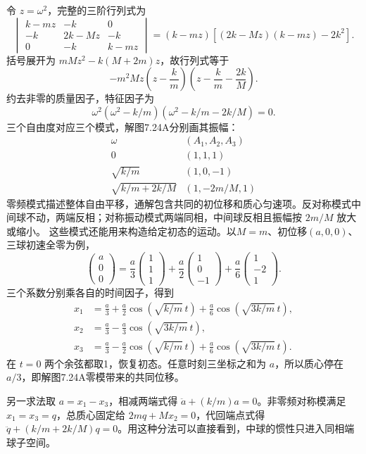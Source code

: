 \documentclass[UTF8,fontset=fandol,a4paper,11pt]{ctexart}
\begin{document}
令 $z=\omega^2$，完整的三阶行列式为
\[
 \begin{vmatrix}k-mz&-k&0\\-k&2k-Mz&-k\\0&-k&k-mz\end{vmatrix}
 =(k-mz)[(2k-Mz)(k-mz)-2k^2].
\]
括号展开为 $mMz^2-k(M+2m)z$，故行列式等于
\[
 -m^2M z\left(z-\frac km\right)
 \left(z-\frac km-\frac{2k}{M}\right).
\]
约去非零的质量因子，特征因子为
\[\omega^2(\omega^2-k/m)(\omega^2-k/m-2k/M)=0.\]
三个自由度对应三个模式，解图7.24A分别画其振幅：
\[\boxed{\begin{array}{c|c}
\omega& (A_1,A_2,A_3)\\\hline
0&(1,1,1)\\
\sqrt{k/m}&(1,0,-1)\\
\sqrt{k/m+2k/M}&(1,-2m/M,1)
\end{array}}\]
零频模式描述整体自由平移，通解包含共同的初位移和质心匀速项。反对称模式中间球不动，两端反相；对称振动模式两端同相，中间球反相且振幅按 $2m/M$ 放大或缩小。
这些模式还能用来构造给定初态的运动。以$M=m$、初位移$(a,0,0)$、三球初速全零为例，
\[\begin{pmatrix}a\\0\\0\end{pmatrix}
=\frac a3\begin{pmatrix}1\\1\\1\end{pmatrix}
+\frac a2\begin{pmatrix}1\\0\\-1\end{pmatrix}
+\frac a6\begin{pmatrix}1\\-2\\1\end{pmatrix}.\]
三个系数分别乘各自的时间因子，得到
\[\begin{aligned}
x_1&=\frac a3+\frac a2\cos(\sqrt{k/m}\,t)+\frac a6\cos(\sqrt{3k/m}\,t),\\
x_2&=\frac a3-\frac a3\cos(\sqrt{3k/m}\,t),\\
x_3&=\frac a3-\frac a2\cos(\sqrt{k/m}\,t)+\frac a6\cos(\sqrt{3k/m}\,t).
\end{aligned}\]
在 $t=0$ 两个余弦都取1，恢复初态。任意时刻三坐标之和为 $a$，所以质心停在 $a/3$，即解图7.24A零模带来的共同位移。

另一求法取 $a=x_1-x_3$，相减两端式得 $\ddot a+(k/m)a=0$。非零频对称模满足 $x_1=x_3=q$，总质心固定给 $2mq+Mx_2=0$，代回端点式得 $\ddot q+(k/m+2k/M)q=0$。用这种分法可以直接看到，中球的惯性只进入同相端球子空间。
\end{document}
